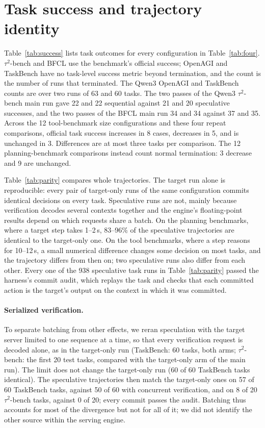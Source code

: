 \section{Task success and trajectory identity}
\label{app:success}
Table~\ref{tab:success} lists task outcomes for every configuration in Table~\ref{tab:four}. $\tau^2$-bench and BFCL use the benchmark's official success; OpenAGI and TaskBench have no
task-level success metric beyond termination, and the count is the number of runs that terminated. The
Qwen3 OpenAGI and TaskBench counts are over two runs of 63 and 60 tasks. The two passes of the Qwen3
$\tau^2$-bench main run gave 22 and 22 sequential against 21 and 20 speculative successes, and the two passes of the
BFCL main run 34 and 34 against 37 and 35. Across the 12 tool-benchmark size configurations and these four repeat comparisons,
official task success increases in 8 cases, decreases in 5, and is unchanged in 3.
Differences are at most three tasks per comparison. The 12 planning-benchmark comparisons instead
count normal termination: 3 decrease and 9 are unchanged.

Table~\ref{tab:parity} compares whole trajectories. The target run alone is reproducible: every pair of
target-only runs of the same configuration commits identical decisions on every task. Speculative runs are not,
mainly because verification decodes several contexts together and the engine's floating-point results depend on which
requests share a batch. On the planning benchmarks, where a target step takes 1--2\,s, 83--96\% of the
speculative trajectories are identical to the target-only one. On the tool benchmarks, where a step reasons for
10--12\,s, a small numerical difference changes some decision on most tasks, and the trajectory differs from
then on; two speculative runs also differ from each other. Every one of the 938 speculative task runs in
Table~\ref{tab:parity} passed the harness's commit audit, which replays the task and checks that each committed
action is the target's output on the context in which it was committed.

\paragraph{Serialized verification.} To separate batching from other effects, we reran speculation with the
target server limited to one sequence at a time, so that every verification request is decoded alone, as in the
target-only run (TaskBench: 60 tasks, both arms; $\tau^2$-bench: the first 20 test tasks, compared with the
target-only arm of the main run). The limit does not change the target-only run (60 of 60 TaskBench tasks
identical). The speculative trajectories then match the target-only ones on 57 of 60 TaskBench tasks, against 50
of 60 with concurrent verification, and on 8 of 20 $\tau^2$-bench tasks, against 0 of 20; every commit passes the
audit. Batching thus accounts for most of the divergence but not for all of it; we did not identify the other
source within the serving engine.

